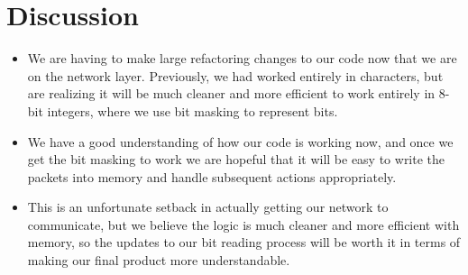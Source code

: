 \documentclass{article}
\begin{document}
\section*{Discussion}
\begin{itemize}
    \item We are having to make large refactoring changes to our code now that we are on the network layer. Previously, we had worked entirely in
    characters, but are realizing it will be much cleaner and more efficient to work entirely in 8-bit integers, where we use bit masking to represent bits.
    \item We have a good understanding of how our code is working now, and once we get the bit masking to work we are hopeful that it will be
    easy to write the packets into memory and handle subsequent actions appropriately. 
    \item This is an unfortunate setback in actually getting our network to communicate, but we believe the logic is much cleaner and more efficient with memory,
    so the updates to our bit reading process will be worth it in terms of making our final product more understandable. 
\end{itemize}

\end{document}
